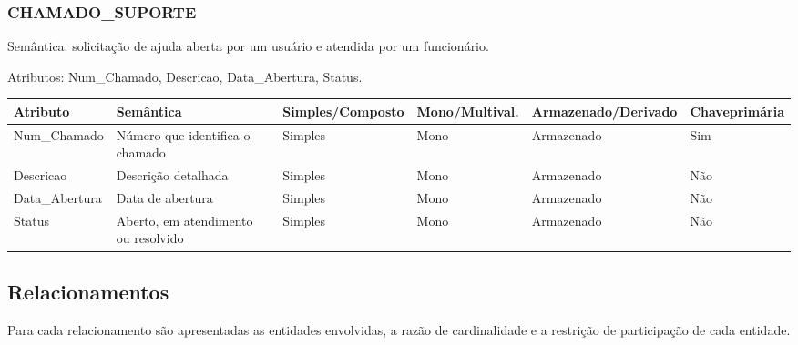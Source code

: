 \documentclass[11pt,a4paper]{article}
\makeatletter
\newenvironment{atributos}{%
  \par\footnotesize
  \noindent\begin{tabular}{@{}L{3.0cm} L{4.9cm} C{1.6cm} C{1.6cm} C{1.9cm} C{1.3cm}@{}}
  \toprule
  Atributo & Semântica & Simples/\newline Composto &
  Mono/\newline Multival. & \mbox{Armazenado/}\newline Derivado & Chave\newline primária \\
  \midrule}{%
  \bottomrule
  \end{tabular}\par\medskip}
\newcommand{\entidade}[3]{%
  \subsubsection*{#1}
  Semântica: #2\par
  Atributos: #3\par\smallskip}
\makeatother
\begin{document}
\entidade{CHAMADO\_SUPORTE}
  {solicitação de ajuda aberta por um usuário e atendida por um funcionário.}
  {Num\_Chamado, Descricao, Data\_Abertura, Status.}
\begin{atributos}
  Num\_Chamado & Número que identifica o chamado & Simples & Mono & Armazenado & Sim \\
  Descricao & Descrição detalhada & Simples & Mono & Armazenado & Não \\
  Data\_Abertura & Data de abertura & Simples & Mono & Armazenado & Não \\
  Status & Aberto, em atendimento ou resolvido & Simples & Mono & Armazenado & Não \\
\end{atributos}

\subsection{Relacionamentos}

Para cada relacionamento são apresentadas as entidades envolvidas, a razão de
cardinalidade e a restrição de participação de cada entidade.
\end{document}
